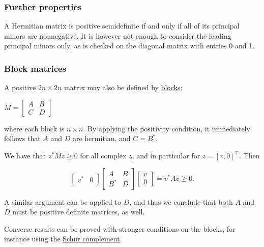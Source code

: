 {{{{{{{{{{{{{{{{{\hypertarget{further-properties}{%
\subsubsection{Further properties}\label{further-properties}}

A Hermitian matrix is positive semidefinite if and only if all of its
principal minors are nonnegative. It is however not enough to consider
the leading principal minors only, as is checked on the diagonal matrix
with entries 0 and 1.

\hypertarget{block-matrices}{%
\subsubsection{Block matrices}\label{block-matrices}}

A positive \(2n \times 2n\) matrix may also be defined by
\href{block_matrix}{blocks}:

\begin{description}
\item
\(M =  \begin{bmatrix} A & B \\ C & D \end{bmatrix}\)
\end{description}

where each block is \(n \times n\). By applying the positivity
condition, it immediately follows that \(A\) and \(D\) are hermitian,
and \(C = B^*\).

We have that \(z^* Mz \ge 0\) for all complex \(z\), and in particular
for \(z = [v, 0]^\top \). Then

\[\begin{bmatrix} v^* & 0 \end{bmatrix} \begin{bmatrix} A & B \\ B^* & D \end{bmatrix} \begin{bmatrix} v \\ 0 \end{bmatrix} = v^* Av \ge 0.\]

A similar argument can be applied to \(D\), and thus we conclude that
both \(A\) and \(D\) must be positive definite matrices, as well.

Converse results can be proved with stronger conditions on the blocks,
for instance using the
\href{Schur_complement\#Schur_complement_condition_for_positive_definiteness}{Schur
complement}.

}}}}}}}}}}}}}}}}}
